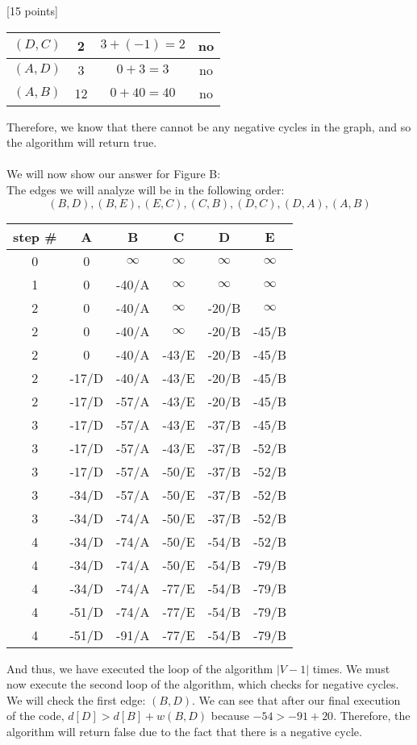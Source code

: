 \documentclass[12pt]{article}
\newcounter{ques}
\newenvironment{question}{\stepcounter{ques}{\noindent\bf Question \arabic{ques}:}}{\vspace{5mm}}
\begin{document}
\begin{question}[15 points]
\begin{center}
\begin{tabular}{||c|c|c|c||}
   \hline
   $(D,C)$ & 2 & $3+(-1)=2$ & no\\
   \hline
   $(A,D)$ & 3 & $0+3=3$ & no\\
   \hline
   $(A,B)$ & 12 & $0+40=40$ & no\\
   \hline
  \end{tabular}
\end{center}
Therefore, we know that there cannot be any negative cycles in the graph, and so the algorithm will return true.\\\\
We will now show our answer for Figure B:\\
The edges we will analyze will be in the following order:
$$(B, D), (B, E), (E, C), (C, B), (D, C), (D, A), (A, B)$$
\begin{center}
  \begin{tabular}{||c | c c c c c||}
   \hline
    step \# & A & B & C & D & E \\ [0.5ex]
   \hline\hline
   0 & 0 & $\infty$ & $\infty$ & $\infty$ & $\infty$\\
   \hline
   1 & 0 & -40/A & $\infty$ & $\infty$ & $\infty$\\
   \hline
   2 & 0 & -40/A & $\infty$ & -20/B & $\infty$\\
   2 & 0 & -40/A & $\infty$ & -20/B & -45/B\\
   2 & 0 & -40/A & -43/E & -20/B & -45/B\\
   2 & -17/D & -40/A & -43/E & -20/B & -45/B\\
   2 & -17/D & -57/A & -43/E & -20/B & -45/B\\
   \hline
   3 & -17/D & -57/A & -43/E & -37/B & -45/B\\
   3 & -17/D & -57/A & -43/E & -37/B & -52/B\\
   3 & -17/D & -57/A & -50/E & -37/B & -52/B\\
   3 & -34/D & -57/A & -50/E & -37/B & -52/B\\
   3 & -34/D & -74/A & -50/E & -37/B & -52/B\\
   \hline
   4 & -34/D & -74/A & -50/E & -54/B & -52/B\\
   4 & -34/D & -74/A & -50/E & -54/B & -79/B\\
   4 & -34/D & -74/A & -77/E & -54/B & -79/B\\
   4 & -51/D & -74/A & -77/E & -54/B & -79/B\\
   4 & -51/D & -91/A & -77/E & -54/B & -79/B\\
   \hline
  \end{tabular}
\end{center}
And thus, we have executed the loop of the algorithm  $|V-1|$ times. We must now execute the second loop of the algorithm, which checks for negative cycles.
We will check the first edge: $(B,D)$.
We can see that after our final execution of the code, $d[D] > d[B] + w(B,D)$ because $-54 > -91 + 20$. Therefore, the algorithm will return false due to the fact that there is a negative cycle.
\newpage
\end{question}
\end{document}
